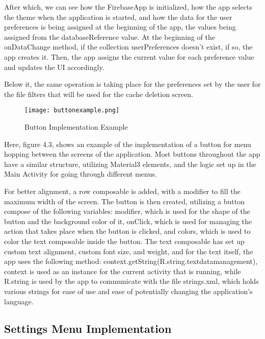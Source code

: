 After which, we can see how the FirebaseApp is initialized, how the app selects the theme when the application is started, and how the data for the user preferences is being assigned at the beginning of the app, the values being assigned from the databaseReference value. At the beginning of the onDataChange method, if the collection userPreferences doesn't exist, if so, the app creates it. Then, the app assigns the current value for each preference value and updates the \ac{UI} accordingly.

Below it, the same operation is taking place for the preferences set by the user for the file filters that will be used for the cache deletion screen.
\newpage

\begin{figure}[htp]
    \centering
    \texttt{[image: buttonexample.png]}
    \caption{Button Implementation Example}
    \label{fig: Button Implementation Example}
\end{figure}

Here, figure 4.3, shows an example of the implementation of a button for menu hopping between the screens of the application. Most buttons throughout the app have a similar structure, utilizing Material3 elements, and the logic set up in the Main Activity for going through different menus.

For better alignment, a row composable is added, with a modifier to fill the maximum width of the screen. The button is then created, utilizing a button compose of the following variables: modifier, which is used for the shape of the button and the background color of it, onClick, which is used for managing the action that takes place when the button is clicked, and colors, which is used to color the text composable inside the button. The text composable has set up custom text alignment, custom font size, and weight, and for the text itself, the app uses the following method: context.getString(R.string.textdatamanagement), context is used as an instance for the current activity that is running, while R.string is used by the app to communicate with the file strings.xml, which holds various strings for ease of use and ease of potentially changing the application's language.

\newpage

\subsection{Settings Menu Implementation}\label{subsect:Settings Menu Implementation}

